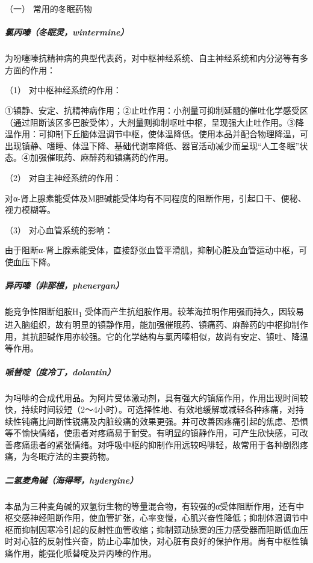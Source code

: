 \hypertarget{text00388.htmlux5cux23CHP16-9-2-1}{}
（一） 常用的冬眠药物

\subparagraph{氯丙嗪（冬眠灵，wintermine）}

为吩噻嗪抗精神病的典型代表药，对中枢神经系统、自主神经系统和内分泌等有多方面的作用：

\hypertarget{text00388.htmlux5cux23CHP16-9-2-1-1-1}{}
（1） 对中枢神经系统的作用：

①镇静、安定、抗精神病作用；②止吐作用：小剂量可抑制延髓的催吐化学感受区（通过阻断该区多巴胺受体），大剂量则抑制呕吐中枢，呈现强大止吐作用。③降温作用：可抑制下丘脑体温调节中枢，使体温降低。使用本品并配合物理降温，可出现镇静、嗜睡、体温下降、基础代谢率降低、器官活动减少而呈现“人工冬眠”状态。④加强催眠药、麻醉药和镇痛药的作用。

\hypertarget{text00388.htmlux5cux23CHP16-9-2-1-1-2}{}
（2） 对自主神经系统的作用：

对α-肾上腺素能受体及M胆碱能受体均有不同程度的阻断作用，引起口干、便秘、视力模糊等。

\hypertarget{text00388.htmlux5cux23CHP16-9-2-1-1-3}{}
（3） 对心血管系统的影响：

由于阻断α-肾上腺素能受体，直接舒张血管平滑肌，抑制心脏及血管运动中枢，可使血压下降。

\subparagraph{异丙嗪（非那根，phenergan）}

能竞争性阻断组胺H\textsubscript{1}
受体而产生抗组胺作用。较苯海拉明作用强而持久，因较易进入脑组织，故有明显的镇静作用，能加强催眠药、镇痛药、麻醉药的中枢抑制作用，其抗胆碱作用亦较强。它的化学结构与氯丙嗪相似，故尚有安定、镇吐、降温等作用。

\subparagraph{哌替啶（度冷丁，dolantin）}

为吗啡的合成代用品。为阿片受体激动剂，具有强大的镇痛作用，作用出现时间较快，持续时间较短（2～4小时）。可选择性地、有效地缓解或减轻各种疼痛，对持续性钝痛比间断性锐痛及内脏绞痛的效果更强。并可改善因疼痛引起的焦虑、恐惧等不愉快情绪，使患者对疼痛易于耐受。有明显的镇静作用，可产生欣快感，可改善疼痛患者的紧张情绪。对呼吸中枢的抑制作用远较吗啡轻，故常用于各种剧烈疼痛，为冬眠疗法的主要药物。

\subparagraph{二氢麦角碱（海得琴，hydergine）}

本品为三种麦角碱的双氢衍生物的等量混合物，有较强的α受体阻断作用，还有中枢交感神经阻断作用，使血管扩张，心率变慢，心肌兴奋性降低；抑制体温调节中枢而抑制因寒冷引起的反射性血管收缩；抑制颈动脉窦的压力感受器而阻断低血压时对心脏的反射性兴奋，防止心率加快，对心脏有良好的保护作用。尚有中枢性镇痛作用，能强化哌替啶及异丙嗪的作用。

